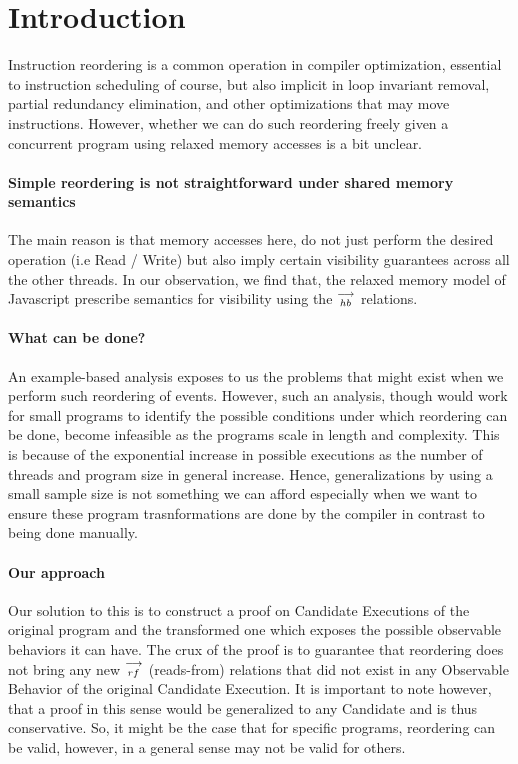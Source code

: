 
\section{Introduction}
    Instruction reordering is a common operation in compiler optimization, essential to instruction scheduling of course, but also implicit in loop invariant removal, partial redundancy elimination, and other optimizations that may move instructions. 
    However, whether we can do such reordering freely given a concurrent program using relaxed memory accesses is a bit unclear. 
     
    
    \paragraph{Simple reordering is not straightforward under shared memory semantics}
    The main reason is that memory accesses here, do not just perform the desired operation (i.e Read / Write) but also imply certain visibility guarantees across all the other threads.  
    In our observation, we find that, the relaxed memory model of Javascript prescribe semantics for visibility using the $\stackrel{\longrightarrow}{_{hb}}$ relations. 
    
    
    \paragraph{What can be done?}
    An example-based analysis exposes to us the problems that might exist when we perform such reordering of events. 
    However, such an analysis, though would work for small programs to identify the possible conditions under which reordering can be done, become infeasible as the programs scale in length and complexity. 
    This is because of the exponential increase in possible executions as the number of threads and program size in general increase. 
    Hence,  generalizations by using a small sample size is not something we can afford especially when we want to ensure these program trasnformations are done by the compiler in contrast to being done manually.
    
    \paragraph{Our approach}
    Our solution to this is to construct a proof on Candidate Executions of the original program and the transformed one which exposes the possible observable behaviors it can have.   
    The crux of the proof is to guarantee that reordering does not bring any new $\stackrel{\longrightarrow}{_{rf}}$ (reads-from) relations that did not exist in any Observable Behavior of the original Candidate Execution. 
    It is important to note however, that a proof in this sense would be generalized to any Candidate and is thus conservative.
    So, it might be the case that for specific programs, reordering can be valid, however, in a general sense may not be valid for others. 

